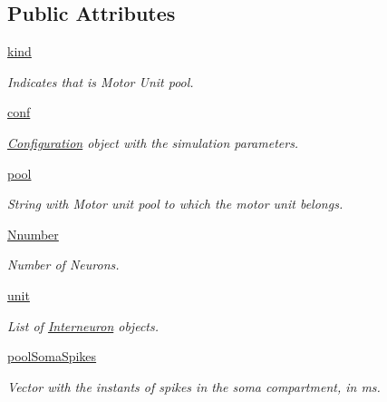 \subsection*{Public Attributes}
\begin{DoxyCompactItemize}
\item 
\hyperlink{class_interneuron_pool_1_1_interneuron_pool_a55b3665ce98a5d6f3937dac3df5afa40}{kind}
\begin{DoxyCompactList}\small\item\em Indicates that is Motor Unit pool. \end{DoxyCompactList}\item 
\hyperlink{class_interneuron_pool_1_1_interneuron_pool_a2418c4def3edaa2e5cd7514df52499d5}{conf}
\begin{DoxyCompactList}\small\item\em \hyperlink{namespace_configuration}{Configuration} object with the simulation parameters. \end{DoxyCompactList}\item 
\hyperlink{class_interneuron_pool_1_1_interneuron_pool_a08c57ed586708a120335dfe72c2d6460}{pool}
\begin{DoxyCompactList}\small\item\em String with Motor unit pool to which the motor unit belongs. \end{DoxyCompactList}\item 
\hyperlink{class_interneuron_pool_1_1_interneuron_pool_a9cbb51ebce056563dee531b2a3de16ad}{Nnumber}
\begin{DoxyCompactList}\small\item\em Number of Neurons. \end{DoxyCompactList}\item 
\hyperlink{class_interneuron_pool_1_1_interneuron_pool_ac685ab8eaf9a18627c61431b987874e6}{unit}
\begin{DoxyCompactList}\small\item\em List of \hyperlink{namespace_interneuron}{Interneuron} objects. \end{DoxyCompactList}\item 
\hyperlink{class_interneuron_pool_1_1_interneuron_pool_a9f887f427350168a5415b7a2918be778}{pool\+Soma\+Spikes}
\begin{DoxyCompactList}\small\item\em Vector with the instants of spikes in the soma compartment, in ms. \end{DoxyCompactList}\end{DoxyCompactItemize}


